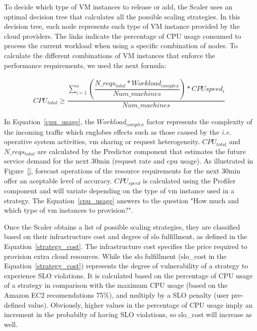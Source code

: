 To decide which type of VM instances to release or add, the Scaler uses an optimal decision tree that calculates all the possible scaling strategies. In this decision tree, each node represents each type of VM instance provided by the cloud providers. The links indicate the percentage of CPU usage consumed to process the current workload when using a specific combination of nodes. To calculate the different combinations of VM instances that enforce the performance requirements, we used the next formula:

{\scriptsize
\begin{equation}\label{cpu_usage}
\begin{split}
CPU_{total} \geqslant \dfrac{ \sum_{i=1}^n ( \dfrac{ N\_reqs_{total} * Workload_{complex} }  {Num\_machines}  ) * CPU speed_{i} }  {Num\_machines} 
\end{split}
\end{equation}
}

In Equation~\ref{cpu_usage}, the \emph{$Workload_{complex}$} factor represents the complexity of the incoming traffic  which englobes effects such as those caused by the \emph{i.e.} operative system activities, vm sharing or request heterogeneity. $CPU_{total}$ and $N\_reqs_{total}$ are calculated by the Predictor component that estimates the future service demand for the next 30min (request rate and cpu usage). As illustrated in Figure~\ref{}, forecast operations of the resource requirements for the next 30min offer an aceptable level of accuracy. $CPU_{speed}$ is calculated using the Profiler component and will variate depending on the type of vm instance used in a strategy. The Equation~\ref{cpu_usage} answers to the question "How much and which type of vm instances to provision?".

Once the Scaler obtains a list of possible scaling strategies, they are classified based on their infrastructure cost and degree of slo fulfillment, as defined in the Equation~\ref{strategy_cost}. The infrastructure cost specifies the price required to provision extra cloud resources. While the slo fulfillment (slo\_cost in the Equation~\ref{strategy_cost}) represents the degree of vulnerability of a strategy to experience SLO violations. It is calculated based on the percentage of CPU usage of a strategy in comparison with the maximum CPU usage (based on the Amazon EC2 recomendations 75\%), and multiply by a SLO penalty (user pre-defined value). Obviously, higher values in the percentage of CPU usage imply an increment in the probabilty of having SLO violations, so slo\_cost will increase as well.


